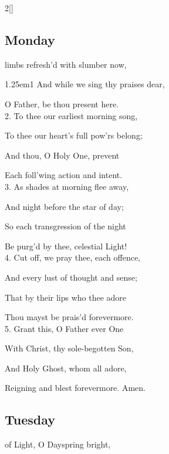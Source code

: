 \begin{paracol}{2}[]
\sloppy

\subsection{Monday}\label{MondayInvitatory}

 limbs refresh'd with slumber now,


\begin{hangparas}{1.25em}{1}
And while we sing thy praises dear,

O Father, be thou present here.\\

2. To thee our earliest morning song,

To thee our heart’s full pow'rs belong;

And thou, O Holy One, prevent

Each foll'wing action and intent.\\

3. As shades at morning flee away,

And night before the star of day;

So each transgression of the night

Be purg'd by thee, celestial Light!\\

4. Cut off, we pray thee, each offence,

And every lust of thought and sense;

That by their lips who thee adore

Thou mayst be prais'd forevermore.\\

5. Grant this, O Father ever One

With Christ, thy sole-begotten Son,

And Holy Ghost, whom all adore,

Reigning and blest forevermore. Amen.
\end{hangparas}

\switchcolumn

\subsection{Tuesday}\label{TuesdayInvitatory}

 of Light, O Dayspring bright,


\end{paracol}
